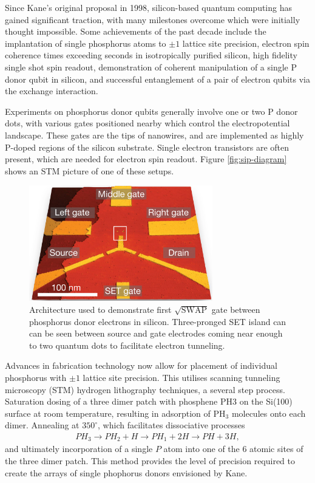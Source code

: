 \documentclass[../Thesis.tex]{subfiles}
\begin{document}
Since Kane's original proposal in 1998, silicon-based quantum computing has gained significant traction, with many milestones overcome which were initially thought impossible. Some achievements of the past decade include the implantation of single phosphorus atoms to $\pm 1$ lattice site precision\cite{sat}, electron spin coherence times exceeding seconds in isotropically purified silicon\cite{Electron-spin-coherence-exceeding-seconds}, high fidelity single shot spin readout\cite{single-shot}, demonstration of coherent manipulation of a single P donor qubit in silicon\cite{single-atom-electron-spin}, and successful entanglement of a pair of electron qubits via the exchange interaction\cite{he_two-qubit_2019}. 

Experiments on phosphorus donor qubits generally involve one or two P donor dots, with various gates positioned nearby which control the electropotential landscape. These gates are the tips of nanowires, and are implemented as highly P-doped regions of the silicon substrate. Single electron transistors are often present, which are needed for electron spin readout. Figure \ref{fig:sip-diagram} shows an STM picture of one of these setups.

\begin{figure}
    \centering
    \includegraphics[width=8cm]{graphics/Introduction/swap_layout.PNG}
    \caption{Architecture used to demonstrate first $\sqrt{\text{SWAP}}$ gate between phosphorus donor electrons in silicon. Three-pronged SET island can can be seen between source and gate electrodes coming near enough to two quantum dots to facilitate electron tunneling.}
    \label{fig:swap-layout}
\end{figure}

Advances in fabrication technology now allow for placement of individual phosphorus with $\pm 1$ lattice site precision\cite{pla_single-atom_2012}. This utilises scanning tunneling microscopy (STM) hydrogen lithography techniques, a several step process. Saturation dosing of a three dimer patch with phosphene PH3 on the Si(100) surface at room temperature, resulting in adsorption of PH$_3$ molecules onto each dimer. Annealing at $350^\circ$, which facilitates dissociative processes\cite{wilson_thermal_2006}
\begin{align}
    PH_3\rightarrow PH_2+H\rightarrow PH_1+2H\rightarrow PH+3H,
\end{align}
and ultimately incorporation of a single $P$ atom into one of the 6 atomic sites of the three dimer patch. This method provides the level of precision required to create the arrays of single phophorus donors envisioned by Kane.
\end{document}
